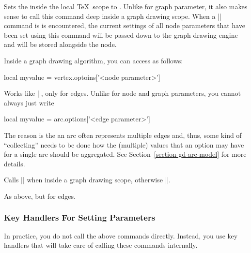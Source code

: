 \begin{command}{\pgfgdnodeparameter{}} 
  Sets the  inside the local \TeX\ scope to
  . Unlike for graph parameter, it also makes sense to
  call this command deep inside a graph drawing scope. When a
  |\pgfnode| command is is encountered, the current settings of all
  node parameters that have been set using this command will be passed
  down to the graph drawing engine and will be stored alongside the
  node. 

  Inside a graph drawing algorithm, you can access  as
  follows:
\begin{codeexample}
  local myvalue = vertex.optoins['<node parameter>']
\end{codeexample}
\end{command}

\begin{command}{\pgfgdedgeparameter{}} 
  Works like |\pgfgdnodeparameter|, only for edges. Unlike for node
  and graph parameters, you cannot always just write 
\begin{codeexample}
  local myvalue = arc.options['<edge parameter>']
\end{codeexample}
  The reason is the an arc often represents multiple edges and, thus,
  some kind of ``collecting'' needs to be done how the (multiple)
  values that an option may have for a single arc should be
  aggregated. See Section~\ref{section-gd-arc-model} for more
  details. 
\end{command}

\begin{command}{\pgfgdhybridnodegraphparameter{}}
  Calls |\pgfgdnodeparameter| when inside a graph drawing scope,
  otherwise |\pgfgdgraphparameter|.  
\end{command}

\begin{command}{\pgfgdhybridedgegraphparameter{}}
  As above, but for edges.
\end{command}



\subsubsection{Key Handlers  For Setting Parameters}

In practice, you do not call the above commands directly. Instead, you
use key handlers that will take care of calling these commands
internally.

